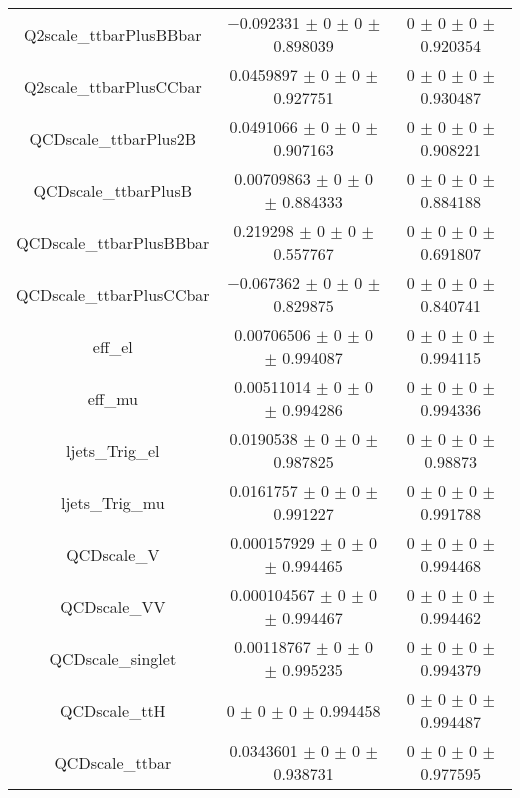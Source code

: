 \begin{table}
\begin{tabular}{ccc}
Q2scale\_ttbarPlusBBbar & \num{-0.092331} $\pm$ \num{0} $\pm$ \num{0} $\pm$ \num{0.898039} & \num{0} $\pm$ \num{0} $\pm$ \num{0} $\pm$ \num{0.920354}\\
Q2scale\_ttbarPlusCCbar & \num{0.0459897} $\pm$ \num{0} $\pm$ \num{0} $\pm$ \num{0.927751} & \num{0} $\pm$ \num{0} $\pm$ \num{0} $\pm$ \num{0.930487}\\
QCDscale\_ttbarPlus2B & \num{0.0491066} $\pm$ \num{0} $\pm$ \num{0} $\pm$ \num{0.907163} & \num{0} $\pm$ \num{0} $\pm$ \num{0} $\pm$ \num{0.908221}\\
QCDscale\_ttbarPlusB & \num{0.00709863} $\pm$ \num{0} $\pm$ \num{0} $\pm$ \num{0.884333} & \num{0} $\pm$ \num{0} $\pm$ \num{0} $\pm$ \num{0.884188}\\
QCDscale\_ttbarPlusBBbar & \num{0.219298} $\pm$ \num{0} $\pm$ \num{0} $\pm$ \num{0.557767} & \num{0} $\pm$ \num{0} $\pm$ \num{0} $\pm$ \num{0.691807}\\
QCDscale\_ttbarPlusCCbar & \num{-0.067362} $\pm$ \num{0} $\pm$ \num{0} $\pm$ \num{0.829875} & \num{0} $\pm$ \num{0} $\pm$ \num{0} $\pm$ \num{0.840741}\\
eff\_el & \num{0.00706506} $\pm$ \num{0} $\pm$ \num{0} $\pm$ \num{0.994087} & \num{0} $\pm$ \num{0} $\pm$ \num{0} $\pm$ \num{0.994115}\\
eff\_mu & \num{0.00511014} $\pm$ \num{0} $\pm$ \num{0} $\pm$ \num{0.994286} & \num{0} $\pm$ \num{0} $\pm$ \num{0} $\pm$ \num{0.994336}\\
ljets\_Trig\_el & \num{0.0190538} $\pm$ \num{0} $\pm$ \num{0} $\pm$ \num{0.987825} & \num{0} $\pm$ \num{0} $\pm$ \num{0} $\pm$ \num{0.98873}\\
ljets\_Trig\_mu & \num{0.0161757} $\pm$ \num{0} $\pm$ \num{0} $\pm$ \num{0.991227} & \num{0} $\pm$ \num{0} $\pm$ \num{0} $\pm$ \num{0.991788}\\
QCDscale\_V & \num{0.000157929} $\pm$ \num{0} $\pm$ \num{0} $\pm$ \num{0.994465} & \num{0} $\pm$ \num{0} $\pm$ \num{0} $\pm$ \num{0.994468}\\
QCDscale\_VV & \num{0.000104567} $\pm$ \num{0} $\pm$ \num{0} $\pm$ \num{0.994467} & \num{0} $\pm$ \num{0} $\pm$ \num{0} $\pm$ \num{0.994462}\\
QCDscale\_singlet & \num{0.00118767} $\pm$ \num{0} $\pm$ \num{0} $\pm$ \num{0.995235} & \num{0} $\pm$ \num{0} $\pm$ \num{0} $\pm$ \num{0.994379}\\
QCDscale\_ttH & \num{0} $\pm$ \num{0} $\pm$ \num{0} $\pm$ \num{0.994458} & \num{0} $\pm$ \num{0} $\pm$ \num{0} $\pm$ \num{0.994487}\\
QCDscale\_ttbar & \num{0.0343601} $\pm$ \num{0} $\pm$ \num{0} $\pm$ \num{0.938731} & \num{0} $\pm$ \num{0} $\pm$ \num{0} $\pm$ \num{0.977595}\\

\end{tabular}
\end{table}
